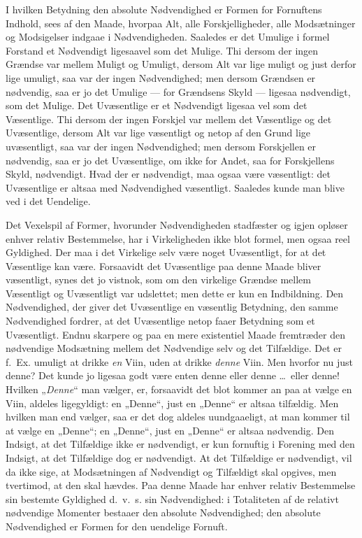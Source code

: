 \documentclass[12pt]{book}
\newcommand{\opage}[1]{\marginnote{\footnotesize\textit{[#1]}}}
\begin{document}
I hvilken Betydning den absolute Nødvendighed er Formen
for Fornuftens Indhold, sees af den Maade, hvorpaa
Alt, alle Forskjelligheder, alle Modsætninger og Modsigelser
indgaae i Nødvendigheden. Saaledes er det Umulige i formel
Forstand et Nødvendigt ligesaavel som det Mulige. Thi
dersom der ingen Grændse var mellem Muligt og Umuligt,
dersom Alt var lige muligt og just derfor lige umuligt, saa
var der ingen Nødvendighed; men dersom Grændsen er nødvendig,
saa er jo det Umulige --- for Grændsens Skyld --- ligesaa
nødvendigt, som det Mulige. Det Uvæsentlige er et Nødvendigt
ligesaa vel som det Væsentlige. Thi dersom der ingen
Forskjel var mellem det Væsentlige og det Uvæsentlige, dersom
Alt var lige væsentligt og netop af den Grund lige uvæsentligt,
saa var der ingen Nødvendighed; men dersom Forskjellen
er nødvendig, saa er jo det Uvæsentlige, om ikke for Andet,
saa for Forskjellens Skyld, nødvendigt. Hvad der er nødvendigt,
maa ogsaa være væsentligt: det Uvæsentlige er altsaa
med Nødvendighed væsentligt. Saaledes kunde man blive ved
i det Uendelige.

\opage{277}Det Vexelspil af Former, hvorunder Nødvendigheden
stadfæster og igjen opløser enhver relativ Bestemmelse, har i
Virkeligheden ikke blot formel, men ogsaa reel Gyldighed.
Der maa i det Virkelige selv være noget Uvæsentligt, for at
det Væsentlige kan være. Forsaavidt det Uvæsentlige paa
denne Maade bliver væsentligt, synes det jo vistnok, som om
den virkelige Grændse mellem Væsentligt og Uvæsentligt var
udslettet; men dette er kun en Indbildning. Den Nødvendighed,
der giver det Uvæsentlige en væsentlig Betydning, den
samme Nødvendighed fordrer, at det Uvæsentlige netop faaer
Betydning som et Uvæsentligt. Endnu skarpere og paa en
mere existentiel Maade fremtræder den nødvendige Modsætning
mellem det Nødvendige selv og det Tilfældige. Det er f.\ Ex.
umuligt at drikke \emph{en} Viin, uden at drikke \emph{denne} Viin. Men
hvorfor nu just denne? Det kunde jo ligesaa godt være enten
denne eller denne \dots\ eller denne! Hvilken „\emph{Denne}“ man
vælger, er, forsaavidt det blot kommer an paa at vælge en Viin,
aldeles ligegyldigt: en „Denne“, just en „Denne“ er altsaa tilfældig.
Men hvilken man end vælger, saa er det dog aldeles
uundgaaeligt, at man kommer til at vælge en „Denne“; en
„Denne“, just en „Denne“ er altsaa nødvendig. Den Indsigt,
at det Tilfældige ikke er nødvendigt, er kun fornuftig i Forening
med den Indsigt, at det Tilfældige dog er nødvendigt. At det
Tilfældige er nødvendigt, vil da ikke sige, at Modsætningen
af Nødvendigt og Tilfældigt skal opgives, men tvertimod, at
den skal hævdes. Paa denne Maade har enhver relativ Bestemmelse
sin bestemte Gyldighed d.\ v.\ s. sin Nødvendighed: i
Totaliteten af de relativt nødvendige Momenter bestaaer den
absolute Nødvendighed; den absolute Nødvendighed er Formen
for den uendelige Fornuft.
\end{document}

